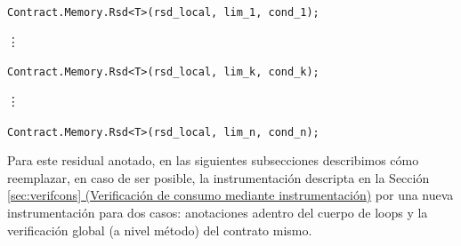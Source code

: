 \documentclass[12pt,a4paper]{article}
\newcommand\mono[1]{\texttt{#1}}
\begin{document}
			\mono{Contract.Memory.Rsd<T>(rsd\_local, lim\_1, cond\_1);}

			\hspace{15pt}\vdots

			\mono{Contract.Memory.Rsd<T>(rsd\_local, lim\_k, cond\_k);}

			\hspace{15pt}\vdots

			\mono{Contract.Memory.Rsd<T>(rsd\_local, lim\_n, cond\_n);}

			Para este residual anotado, en las siguientes subsecciones describimos cómo reemplazar, en caso de ser posible, la instrumentación descripta en la Sección \hyperref[sec:verifcons]{\ref*{sec:verifcons} (Verificación de consumo mediante instrumentación)} por una nueva instrumentación para dos casos: anotaciones adentro del cuerpo de loops y la verificación global (a nivel método) del contrato mismo.
\end{document}
